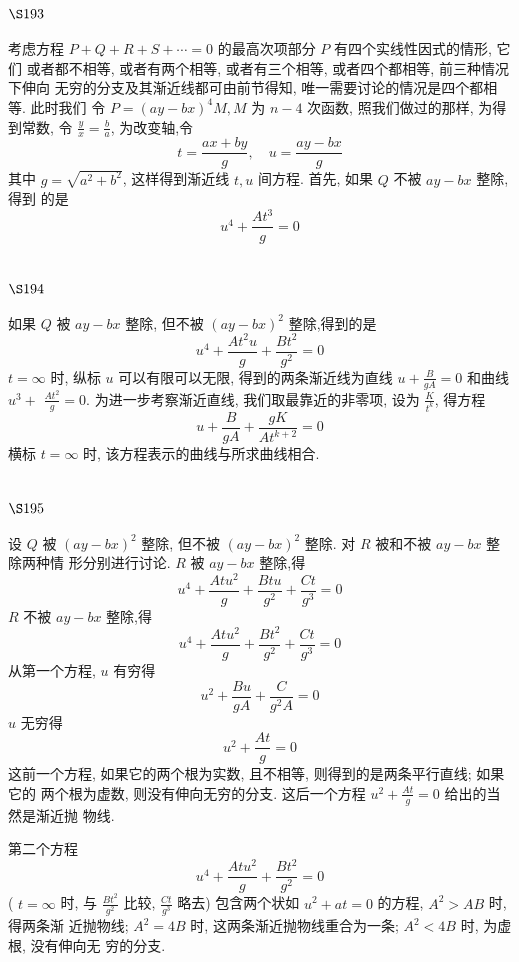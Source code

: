 \section{$\S 193$}

考虑方程 $P+Q+R+S+\cdots=0$ 的最高次项部分 $P$ 有四个实线性因式的情形, 它们 或者都不相等, 或者有两个相等, 或者有三个相等, 或者四个都相等, 前三种情况下伸向 无穷的分支及其渐近线都可由前节得知, 唯一需要讨论的情况是四个都相等. 此时我们 令 $P=(a y-b x)^{4} M, M$ 为 $n-4$ 次函数, 照我们做过的那样, 为得到常数, 令 $\frac{y}{x}=\frac{b}{a}$, 为改变轴,令
\[
t=\frac{a x+b y}{g}, \quad u=\frac{a y-b x}{g}
\]
其中 $g=\sqrt{a^{2}+b^{2}}$, 这样得到渐近线 $t, u$ 间方程. 首先, 如果 $Q$ 不被 $a y-b x$ 整除, 得到 的是
\[
u^{4}+\frac{A t^{3}}{g}=0
\]
\section{$\S 194$}

如果 $Q$ 被 $a y-b x$ 整除, 但不被 $(a y-b x)^{2}$ 整除,得到的是
\[
u^{4}+\frac{A t^{2} u}{g}+\frac{B t^{2}}{g^{2}}=0
\]
$t=\infty$ 时, 纵标 $u$ 可以有限可以无限, 得到的两条渐近线为直线 $u+\frac{B}{g A}=0$ 和曲线 $u^{3}+$ $\frac{A t^{2}}{g}=0$. 为进一步考察渐近直线, 我们取最靠近的非零项, 设为 $\frac{K}{t^{k}}$, 得方程
\[
u+\frac{B}{g A}+\frac{g K}{A t^{k+2}}=0
\]
横标 $t=\infty$ 时, 该方程表示的曲线与所求曲线相合.

\section{$\S 195$}

设 $Q$ 被 $(a y-b x)^{2}$ 整除, 但不被 $(a y-b x)^{2}$ 整除. 对 $R$ 被和不被 $a y-b x$ 整除两种情 形分别进行讨论. $R$ 被 $a y-b x$ 整除,得
\[
u^{4}+\frac{A t u^{2}}{g}+\frac{B t u}{g^{2}}+\frac{C t}{g^{3}}=0
\]
$R$ 不被 $a y-b x$ 整除,得
\[
u^{4}+\frac{A t u^{2}}{g}+\frac{B t^{2}}{g^{2}}+\frac{C t}{g^{3}}=0
\]
从第一个方程, $u$ 有穷得
\[
u^{2}+\frac{B u}{g A}+\frac{C}{g^{2} A}=0
\]
$u$ 无穷得
\[
u^{2}+\frac{A t}{g}=0
\]
这前一个方程, 如果它的两个根为实数, 且不相等, 则得到的是两条平行直线; 如果它的 两个根为虚数, 则没有伸向无穷的分支. 这后一个方程 $u^{2}+\frac{A t}{g}=0$ 给出的当然是渐近抛 物线. 

第二个方程
\[
u^{4}+\frac{A t u^{2}}{g}+\frac{B t^{2}}{g^{2}}=0
\]
( $t=\infty$ 时, 与 $\frac{B t^{2}}{g^{2}}$ 比较, $\frac{C t}{g^{3}}$ 略去) 包含两个状如 $u^{2}+a t=0$ 的方程, $A^{2}>A B$ 时, 得两条渐 近抛物线; $A^{2}=4 B$ 时, 这两条渐近抛物线重合为一条; $A^{2}<4 B$ 时, 为虚根, 没有伸向无 穷的分支.

